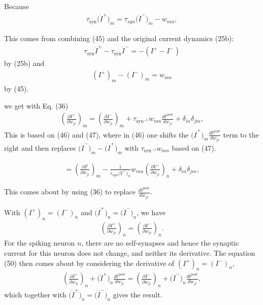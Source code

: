 \documentclass[a4paper]{article}
\newcommand{\blue}[1]{{\color{blue}#1}}
\begin{document}
\blue{
  Because
  \begin{align}
    \tau_{\text{syn}} \big(\dot{I}^+\big)_m =
    \tau_{syn}\big(\dot{I}^-\big)_m - w_{mn}, \tag{47}
  \end{align}
}

This comes from combining \blue{(45)} and the original current
dynamics \blue{(25b)}:
\begin{align}
  \tau_{\text{syn}} \dot{I}^+ - \tau_{\text{syn}} \dot{I}^- = -(I^+ -
  I^-)
\end{align}
by \blue{(25b)} and
\begin{align} 
(I^+)_m -  (I^-)_m = w_{mn}
\end{align}
by \blue{(45)}.

\blue{
  we get with Eq. (36)
  \begin{align}
    \left(\frac{\partial I^+}{\partial{w_{ji}}}\right)_m =
    \left(\frac{\partial I^-}{\partial w_{ji}}\right)_m +
    \tau_{\text{syn}^{-1}} w_{mn} \frac{d t^{\text{post}}}{d w_{ji}} +
    \delta_{in}\delta_{jm}, \tag{48} 
  \end{align}
}
This is based on \blue{(46)} and \blue{(47)}, where in \blue{(46)} one
shifts the $\big(\dot{I}^+\big)_m\frac{d t^{\text{post}}}{d w_{ji}}$
term to the right and then replaces $\big(\dot{I}^-\big)_m -
\big(\dot{I}^+\big)_m$ with $\tau_{\text{syn}^{-1}} w_{mn}$ based on \blue{(47)}.

\blue{
\begin{align}
  = \left(\frac{\partial I^i}{\partial w_{ji}}\right)_m -
  \frac{1}{\tau_{syn} \big(\dot{V}^-\big)_n} w_{mn}
  \left(\frac{\partial V^-}{\partial w_{ji}}\right)_n +
    \delta_{in}\delta_{jm}, \tag{49} 
\end{align}
}

This comes about by using \blue{(36)} to replace $\frac{d
  t^{\text{post}}}{d w_{ji}}$.

\blue{
  With $(I^+)_n = (I^-)_n$ and $\big(\dot{I}^+\big)_n =
  \big(\dot{I}^-\big)_n$, we have
  \begin{align}
    \left(\frac{\partial I^+}{\partial w_{ji}}\right)_n =
    \left(\frac{\partial I^-}{\partial w_{ji}}\right)_n. \tag{50}
  \end{align}
}
For the spiking neuron $n$, there are no self-synapses and hence the
synaptic current for this neuron does not change, and neither its
derivative. The equation \blue{(50)} then comes about by considering
the derivative of $(I^+)_n = (I^-)_n$,
\begin{align}
    \left(\frac{\partial I^+}{\partial w_{ji}}\right)_n +
    \big(\dot{I}^+\big)_n \frac{d t^{\text{post}}}{d w_{ji}} =
    \left(\frac{\partial I^-}{\partial w_{ji}}\right)_n  +
    \big(\dot{I}^-\big)_n \frac{d t^{\text{post}}}{d w_{ji}},
\end{align}
which together with $\big(\dot{I}^+\big)_n =
  \big(\dot{I}^-\big)_n$ gives the result.
\end{document}
